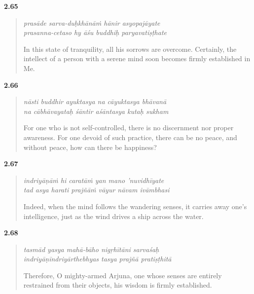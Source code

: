 \par\noindent\textbf{2.65}\par
\begin{verse}
\textit{prasāde sarva-duḥkhānāṁ hānir asyopajāyate} \\
\textit{prasanna-cetaso hy āśu buddhiḥ paryavatiṣṭhate}

\noindent In this state of tranquility, all his sorrows are overcome. Certainly, the intellect of a person with a serene mind soon becomes firmly established in Me.
\end{verse}
\par



\par\noindent\textbf{2.66}\par
\begin{verse}
\textit{nāsti buddhir ayuktasya na cāyuktasya bhāvanā} \\
\textit{na cābhāvayataḥ śāntir aśāntasya kutaḥ sukham}

\noindent For one who is not self-controlled, there is no discernment nor proper awareness. For one devoid of such practice, there can be no peace, and without peace, how can there be happiness?
\end{verse}
\par



\par\noindent\textbf{2.67}\par
\begin{verse}
\textit{indriyāṇāṁ hi caratāṁ yan mano ’nuvidhīyate} \\
\textit{tad asya harati prajñāṁ vāyur nāvam ivāmbhasi}

\noindent Indeed, when the mind follows the wandering senses, it carries away one’s intelligence, just as the wind drives a ship across the water.
\end{verse}
\par



\par\noindent\textbf{2.68}\par
\begin{verse}
\textit{tasmād yasya mahā-bāho nigṛhītāni sarvaśaḥ} \\
\textit{indriyāṇīndriyārthebhyas tasya prajñā pratiṣṭhitā}

\noindent Therefore, O mighty-armed Arjuna, one whose senses are entirely restrained from their objects, his wisdom is firmly established.
\end{verse}
\par



